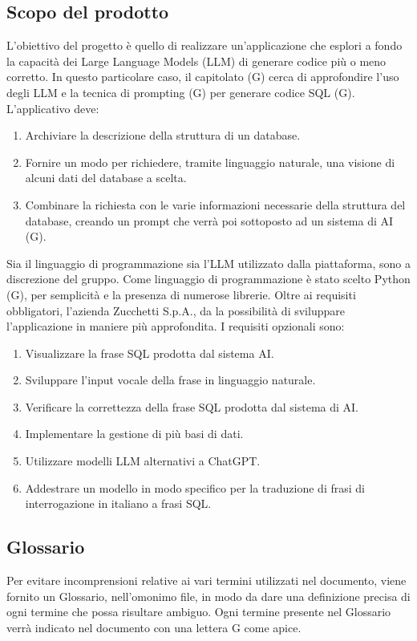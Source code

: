 \documentclass{article}
\begin{document}
\subsection{Scopo del prodotto}
L'obiettivo del progetto è quello di realizzare un'applicazione che esplori a fondo la capacità dei Large Language Models (LLM) di generare codice più o meno corretto. In questo particolare caso, il capitolato (G) cerca di approfondire l'uso degli LLM e la tecnica di prompting (G) per generare codice SQL (G).
L'applicativo deve:
\begin{enumerate}
    \item Archiviare la descrizione della struttura di un database.
    \item Fornire un modo per richiedere, tramite linguaggio naturale, una visione di alcuni dati del database a scelta.
    \item Combinare la richiesta con le varie informazioni necessarie della struttura del database, creando un prompt che verrà poi sottoposto ad un sistema di AI (G).
\end{enumerate}
Sia il linguaggio di programmazione sia l'LLM utilizzato dalla piattaforma, sono a discrezione del gruppo. Come linguaggio di programmazione è stato scelto Python (G), per semplicità e la presenza di numerose librerie.
Oltre ai requisiti obbligatori, l'azienda Zucchetti S.p.A., da la possibilità di sviluppare l'applicazione in maniere più approfondita. I requisiti opzionali sono:
\begin{enumerate}
    \item Visualizzare la frase SQL prodotta dal sistema AI.
    \item Sviluppare l'input vocale della frase in linguaggio naturale.
    \item Verificare la correttezza della frase SQL prodotta dal sistema di AI.
    \item Implementare la gestione di più basi di dati.
    \item Utilizzare modelli LLM alternativi a ChatGPT.
    \item Addestrare un modello in modo specifico per la traduzione di frasi di interrogazione in italiano a frasi SQL.
\end{enumerate}

\subsection{Glossario}
Per evitare incomprensioni relative ai vari termini utilizzati nel documento, viene fornito un Glossario, nell'omonimo file, in modo da dare una definizione precisa di ogni termine che possa risultare ambiguo. Ogni termine presente nel Glossario verrà indicato nel documento con una lettera G come apice.
\end{document}
